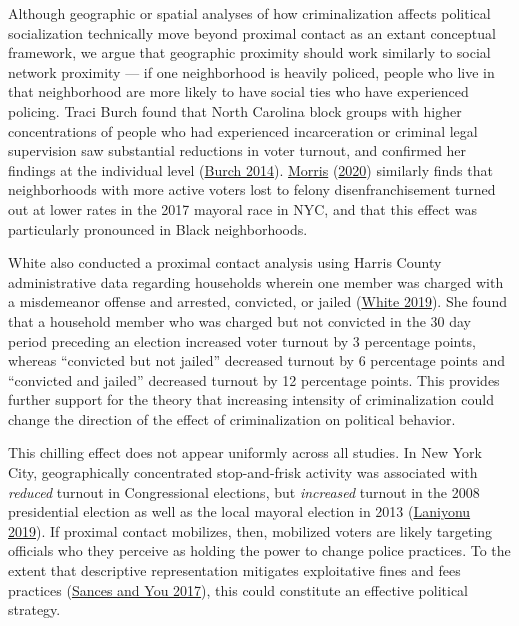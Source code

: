 \documentclass[
  12pt,
]{article}
\begin{document}
Although geographic or spatial analyses of how criminalization affects political socialization technically move beyond proximal contact as an extant conceptual framework, we argue that geographic proximity should work similarly to social network proximity --- if one neighborhood is heavily policed, people who live in that neighborhood are more likely to have social ties who have experienced policing. Traci Burch found that North Carolina block groups with higher concentrations of people who had experienced incarceration or criminal legal supervision saw substantial reductions in voter turnout, and confirmed her findings at the individual level (\protect\hyperlink{ref-Burch2014}{Burch 2014}). \protect\hyperlink{ref-Morris2020}{Morris} (\protect\hyperlink{ref-Morris2020}{2020}) similarly finds that neighborhoods with more active voters lost to felony disenfranchisement turned out at lower rates in the 2017 mayoral race in NYC, and that this effect was particularly pronounced in Black neighborhoods.

White also conducted a proximal contact analysis using Harris County administrative data regarding households wherein one member was charged with a misdemeanor offense and arrested, convicted, or jailed (\protect\hyperlink{ref-White2019}{White 2019}). She found that a household member who was charged but not convicted in the 30 day period preceding an election increased voter turnout by 3 percentage points, whereas ``convicted but not jailed'' decreased turnout by 6 percentage points and ``convicted and jailed'' decreased turnout by 12 percentage points. This provides further support for the theory that increasing intensity of criminalization could change the direction of the effect of criminalization on political behavior.

This chilling effect does not appear uniformly across all studies. In New York City, geographically concentrated stop-and-frisk activity was associated with \emph{reduced} turnout in Congressional elections, but \emph{increased} turnout in the 2008 presidential election as well as the local mayoral election in 2013 (\protect\hyperlink{ref-Laniyonu2019}{Laniyonu 2019}). If proximal contact mobilizes, then, mobilized voters are likely targeting officials who they perceive as holding the power to change police practices. To the extent that descriptive representation mitigates exploitative fines and fees practices (\protect\hyperlink{ref-Sances2017}{Sances and You 2017}), this could constitute an effective political strategy.
\end{document}
